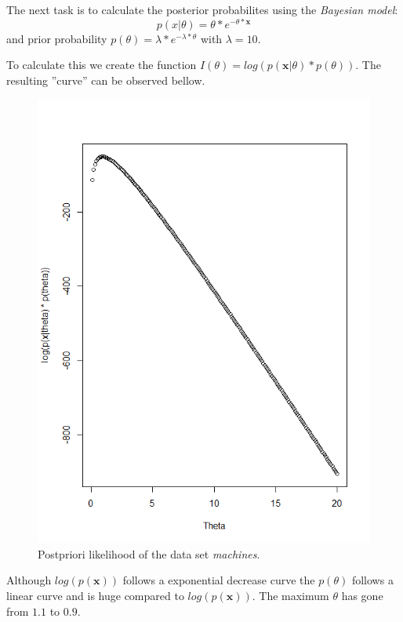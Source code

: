 \documentclass[a4paper,12pt]{article}
\begin{document}
The next task is to calculate the posterior probabilites using the \textit{Bayesian model}: 
\begin{equation}
  p(x|\theta) = \theta * e^{-\theta * \mathbf{x}}
\end{equation}
and prior probability \(p(\theta) = \lambda * e^{-\lambda*\theta} \) with \( \lambda = 10\).  

To calculate this we create the function \(I(\theta) = log(p(\textbf{x}|\theta) * p(\theta))\).  The resulting ''curve'' can be observed bellow.
\begin{figure}[H]
\centering
\begin{minipage}[]{0.5\textwidth}
  \includegraphics[width=\textwidth]{figures/Lab1_A2_post.png}  
  \caption{Postpriori likelihood of the data set \textit{machines}.\label{fig:Postpriori likelihood of the data set machines} }
 \end{minipage}
\end{figure}
Although \( log(p(\mathbf{x}))\) follows a exponential decrease curve the \(p(\theta)\) follows a linear curve and is huge compared to \( log(p(\mathbf{x}))\). The maximum \(\theta\) has gone from \(1.1\) to \(0.9\).
\end{document}
